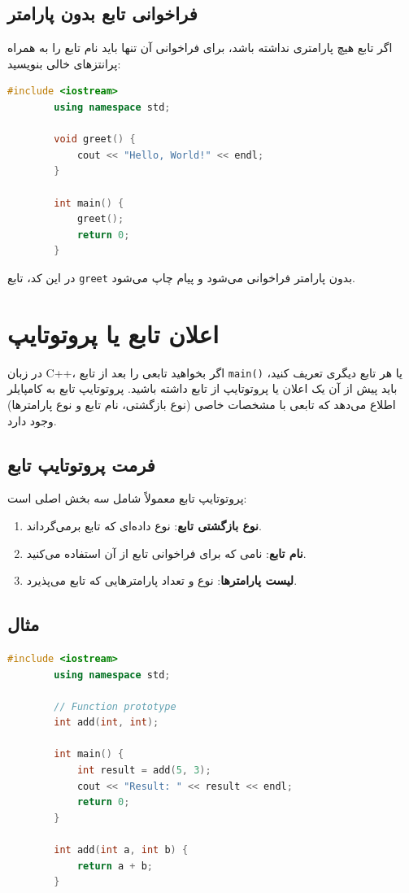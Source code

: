 \documentclass[12pt, a4paper]{report}
\begin{document}
\subsection{فراخوانی تابع بدون پارامتر}

اگر تابع هیچ پارامتری نداشته باشد، برای فراخوانی آن تنها باید نام تابع را به همراه پرانتزهای خالی بنویسید:

\begin{LTR} %
	\begin{lstlisting}[language=C++, breaklines=true]
		#include <iostream>
		using namespace std;
		
		void greet() {
			cout << "Hello, World!" << endl;
		}
		
		int main() {
			greet();
			return 0;
		}
	\end{lstlisting}
\end{LTR}

در این کد، تابع \texttt{greet} بدون پارامتر فراخوانی می‌شود و پیام  چاپ می‌شود.

\section{اعلان تابع یا پروتوتایپ}

در زبان C++، اگر بخواهید تابعی را بعد از تابع \texttt{main()} یا هر تابع دیگری تعریف کنید، باید پیش از آن یک اعلان یا پروتوتایپ از تابع داشته باشید. پروتوتایپ تابع به کامپایلر اطلاع می‌دهد که تابعی با مشخصات خاصی (نوع بازگشتی، نام تابع و نوع پارامترها) وجود دارد.

\subsection{فرمت پروتوتایپ تابع}
پروتوتایپ تابع معمولاً شامل سه بخش اصلی است:
\begin{enumerate}
	\item \textbf{نوع بازگشتی تابع}: نوع داده‌ای که تابع برمی‌گرداند.
	\item \textbf{نام تابع}: نامی که برای فراخوانی تابع از آن استفاده می‌کنید.
	\item \textbf{لیست پارامترها}: نوع و تعداد پارامترهایی که تابع می‌پذیرد.
\end{enumerate}

\subsection{مثال}

\begin{LTR} %
	\begin{lstlisting}[language=C++, breaklines=true]
		#include <iostream>
		using namespace std;
		
		// Function prototype
		int add(int, int);
		
		int main() {
			int result = add(5, 3);
			cout << "Result: " << result << endl;
			return 0;
		}
		
		int add(int a, int b) {
			return a + b;
		}
	\end{lstlisting}
\end{LTR}
\end{document}
